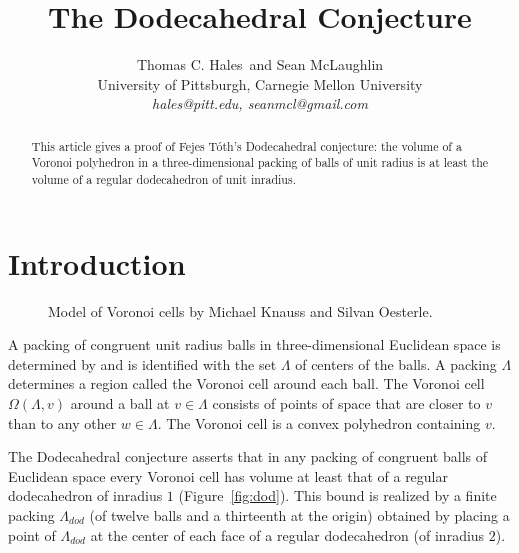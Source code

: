 \documentclass{article} %
\begin{document}
\title{The Dodecahedral Conjecture}
\author{Thomas C. Hales\ and Sean McLaughlin \\
        \normalsize{University of Pittsburgh, Carnegie Mellon University} \\
        \normalsize{\it{hales@pitt.edu, seanmcl@gmail.com}}}
\date{}
\maketitle

\begin{abstract}  
This article gives a proof of Fejes T\'oth's Dodecahedral conjecture:
the volume of a Voronoi polyhedron in a three-dimensional packing of
balls of unit radius is at least the volume of a regular dodecahedron
of unit inradius.
\end{abstract}


\section{Introduction}

\begin{figure}[htb]
  \begin{center}
   \end{center}
  \caption{Model of Voronoi cells by Michael Knauss and Silvan Oesterle.}
  \label{fig:voronoi}
\end{figure}

A packing of congruent unit radius balls in three-dimensional
Euclidean space is determined by and is identified with the set
$\Lambda$ of centers of the balls.
A packing  $\Lambda$ determines a region called the Voronoi cell around
each ball.  The Voronoi cell
$\Omega(\Lambda,v)$ around a ball at $v\in \Lambda$ consists of points
of space that are closer to $v$ than to any other $w\in\Lambda$. The
Voronoi cell is a convex polyhedron containing $v$.

The Dodecahedral conjecture asserts that in any packing of congruent balls of Euclidean
space every Voronoi cell has volume at least that of a regular dodecahedron
of inradius $1$ (Figure~\ref{fig:dod}).    This bound is realized by a finite 
packing $\Lambda_{dod}$
(of twelve balls and a thirteenth  at the origin) obtained
by placing a point of $\Lambda_{dod}$ at the center of each face of a regular dodecahedron (of inradius $2$).
\end{document}
